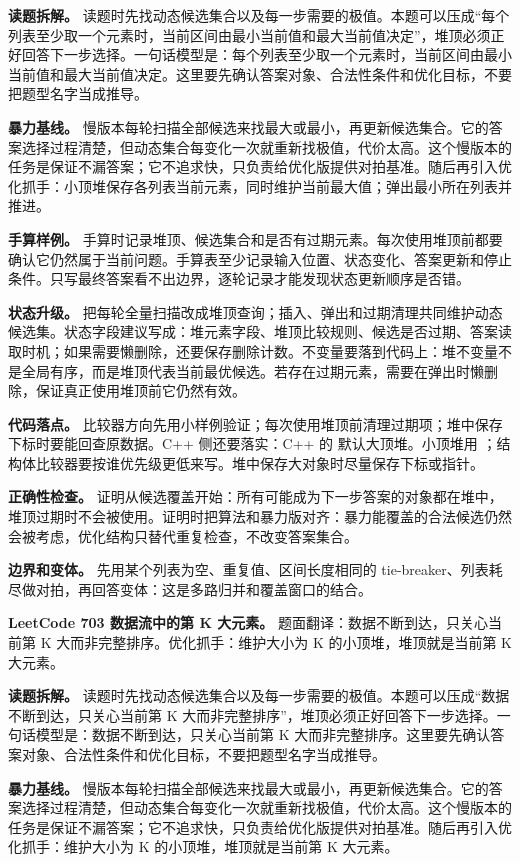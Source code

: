 \textbf{读题拆解。} 读题时先找动态候选集合以及每一步需要的极值。本题可以压成“每个列表至少取一个元素时，当前区间由最小当前值和最大当前值决定”，堆顶必须正好回答下一步选择。一句话模型是：每个列表至少取一个元素时，当前区间由最小当前值和最大当前值决定。这里要先确认答案对象、合法性条件和优化目标，不要把题型名字当成推导。

\textbf{暴力基线。} 慢版本每轮扫描全部候选来找最大或最小，再更新候选集合。它的答案选择过程清楚，但动态集合每变化一次就重新找极值，代价太高。这个慢版本的任务是保证不漏答案；它不追求快，只负责给优化版提供对拍基准。随后再引入优化抓手：小顶堆保存各列表当前元素，同时维护当前最大值；弹出最小所在列表并推进。

\textbf{手算样例。} 手算时记录堆顶、候选集合和是否有过期元素。每次使用堆顶前都要确认它仍然属于当前问题。手算表至少记录输入位置、状态变化、答案更新和停止条件。只写最终答案看不出边界，逐轮记录才能发现状态更新顺序是否错。

\textbf{状态升级。} 把每轮全量扫描改成堆顶查询；插入、弹出和过期清理共同维护动态候选集。状态字段建议写成：堆元素字段、堆顶比较规则、候选是否过期、答案读取时机；如果需要懒删除，还要保存删除计数。不变量要落到代码上：堆不变量不是全局有序，而是堆顶代表当前最优候选。若存在过期元素，需要在弹出时懒删除，保证真正使用堆顶前它仍然有效。

\textbf{代码落点。} 比较器方向先用小样例验证；每次使用堆顶前清理过期项；堆中保存下标时要能回查原数据。C++ 侧还要落实：C++ 的  默认大顶堆。小顶堆用 ；结构体比较器要按谁优先级更低来写。堆中保存大对象时尽量保存下标或指针。

\textbf{正确性检查。} 证明从候选覆盖开始：所有可能成为下一步答案的对象都在堆中，堆顶过期时不会被使用。证明时把算法和暴力版对齐：暴力能覆盖的合法候选仍然会被考虑，优化结构只替代重复检查，不改变答案集合。

\textbf{边界和变体。} 先用某个列表为空、重复值、区间长度相同的 tie-breaker、列表耗尽做对拍，再回答变体：这是多路归并和覆盖窗口的结合。

\noindent\textbf{LeetCode 703 数据流中的第 K 大元素。} 题面翻译：数据不断到达，只关心当前第 K 大而非完整排序。优化抓手：维护大小为 K 的小顶堆，堆顶就是当前第 K 大元素。

\textbf{读题拆解。} 读题时先找动态候选集合以及每一步需要的极值。本题可以压成“数据不断到达，只关心当前第 K 大而非完整排序”，堆顶必须正好回答下一步选择。一句话模型是：数据不断到达，只关心当前第 K 大而非完整排序。这里要先确认答案对象、合法性条件和优化目标，不要把题型名字当成推导。

\textbf{暴力基线。} 慢版本每轮扫描全部候选来找最大或最小，再更新候选集合。它的答案选择过程清楚，但动态集合每变化一次就重新找极值，代价太高。这个慢版本的任务是保证不漏答案；它不追求快，只负责给优化版提供对拍基准。随后再引入优化抓手：维护大小为 K 的小顶堆，堆顶就是当前第 K 大元素。

